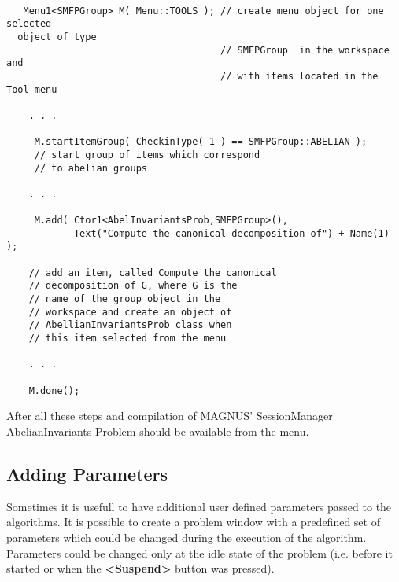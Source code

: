 \documentclass[12pt]{article}
\def\nsmagnus{MAGNUS}
\begin{document}
  \footnotesize
  \begin{verbatim}

   Menu1<SMFPGroup> M( Menu::TOOLS ); // create menu object for one selected 
  object of type
                                      // SMFPGroup  in the workspace and 
                                      // with items located in the Tool menu 

    . . .

     M.startItemGroup( CheckinType( 1 ) == SMFPGroup::ABELIAN ); 
     // start group of items which correspond
     // to abelian groups
   
    . . .

     M.add( Ctor1<AbelInvariantsProb,SMFPGroup>(),  
            Text("Compute the canonical decomposition of") + Name(1) );    

    // add an item, called Compute the canonical 
    // decomposition of G, where G is the
    // name of the group object in the
    // workspace and create an object of
    // AbellianInvariantsProb class when 
    // this item selected from the menu 

    . . .
    
    M.done();

  \end{verbatim}
  \normalsize

  After all these steps and compilation of \nsmagnus' SessionManager 
  AbelianInvariants Problem should be available from  the menu.

\subsection{Adding Parameters}

Sometimes it is usefull to have additional user defined parameters 
passed to the algorithms. It is possible to create a problem window
with  a predefined set of parameters which could be changed during 
the execution of the algorithm. Parameters could be changed only at 
the idle state of the problem (i.e. before it started or when the 
\textbf{<Suspend>} button  was pressed). 
\end{document}
